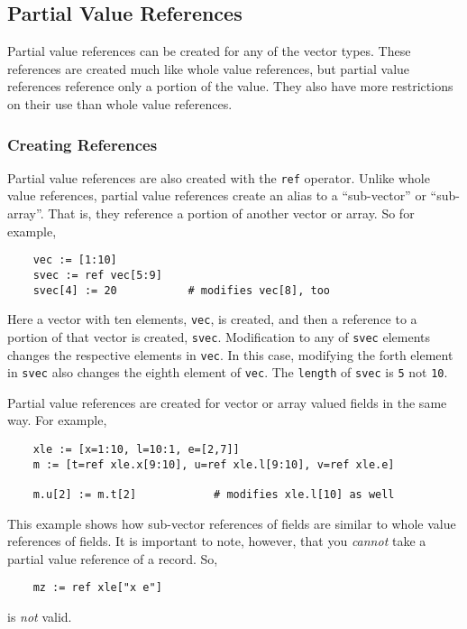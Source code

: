 
\subsection{Partial Value References}
\label{partial-value-references}

Partial value references can be created for any of the vector types. These
references are created much like whole value references, but partial value
references reference only a portion of the value. They also have more
restrictions on their use than whole value references.

\subsubsection{Creating References}

Partial value references are also created with the {\tt ref} operator. Unlike whole
value references, partial value references create an alias to a ``sub-vector'' or
``sub-array''. That is, they reference a portion of another vector or array. So for
example,
\begin{verbatim}
    vec := [1:10]
    svec := ref vec[5:9]
    svec[4] := 20           # modifies vec[8], too
\end{verbatim}
Here a vector with ten elements, {\tt vec}, is created, and then a reference to a
portion of that vector is created, {\tt svec}. Modification to any of {\tt svec}
elements changes the respective elements in {\tt vec}. In this case, modifying the
forth element in {\tt svec} also changes the eighth element of {\tt vec}. The
{\tt length} of {\tt svec} is {\tt 5} not {\tt 10}.

Partial value references are created for vector or array valued fields in the
same way. For example,
\begin{verbatim}
    xle := [x=1:10, l=10:1, e=[2,7]]
    m := [t=ref xle.x[9:10], u=ref xle.l[9:10], v=ref xle.e]

    m.u[2] := m.t[2]            # modifies xle.l[10] as well
\end{verbatim}
This example shows how sub-vector references of fields are similar
to whole value references
of fields. It is important to note, however, that you {\em cannot} take a 
partial value reference of a record. So,
\begin{verbatim}
    mz := ref xle["x e"]
\end{verbatim}
is {\em not} valid.

